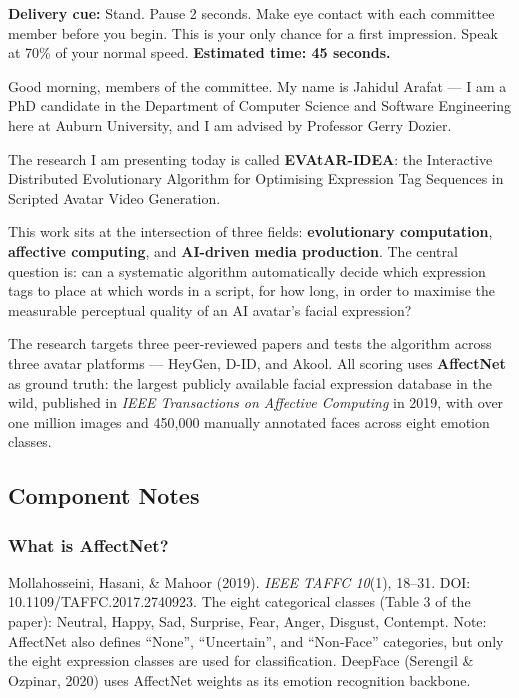 \documentclass[12pt,a4paper]{article}
\begin{document}
\begin{cuebox}
\textbf{Delivery cue:} Stand. Pause 2 seconds. Make eye contact with each committee member before
you begin. This is your only chance for a first impression. Speak at 70\% of your normal speed.
\textbf{Estimated time: 45 seconds.}
\end{cuebox}

\begin{speechbox}
Good morning, members of the committee. My name is Jahidul Arafat --- I am a PhD candidate in
the Department of Computer Science and Software Engineering here at Auburn University, and I am
advised by Professor Gerry Dozier.

The research I am presenting today is called \textbf{EVAtAR-IDEA}: the Interactive Distributed
Evolutionary Algorithm for Optimising Expression Tag Sequences in Scripted Avatar Video Generation.

This work sits at the intersection of three fields: \textbf{evolutionary computation},
\textbf{affective computing}, and \textbf{AI-driven media production}. The central question is:
can a systematic algorithm automatically decide which expression tags to place at which words
in a script, for how long, in order to maximise the measurable perceptual quality of an AI
avatar's facial expression?

The research targets three peer-reviewed papers and tests the algorithm across three avatar
platforms --- HeyGen, D-ID, and Akool. All scoring uses \textbf{AffectNet} as ground truth:
the largest publicly available facial expression database in the wild, published in
\textit{IEEE Transactions on Affective Computing} in 2019, with over one million images and
450{,}000 manually annotated faces across eight emotion classes.
\end{speechbox}

\subsection{Component Notes}

\subsubsection{What is AffectNet?}
Mollahosseini, Hasani, \& Mahoor (2019). \textit{IEEE TAFFC 10}(1), 18--31.
DOI: 10.1109/TAFFC.2017.2740923.
The eight categorical classes (Table 3 of the paper): Neutral, Happy, Sad, Surprise, Fear,
Anger, Disgust, Contempt. Note: AffectNet also defines ``None'', ``Uncertain'', and
``Non-Face'' categories, but only the eight expression classes are used for classification.
DeepFace (Serengil \& Ozpinar, 2020) uses AffectNet weights as its emotion recognition backbone.
\end{document}

